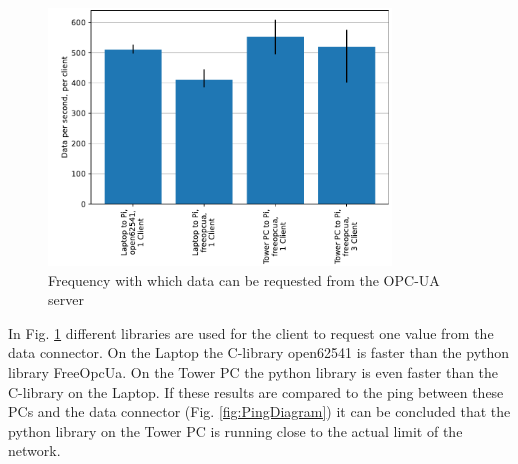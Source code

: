 \documentclass[conference]{IEEEtran}
\begin{document}
\begin{figure}[htbp]
    \centerline{\includegraphics[width=9.1cm]{Pictures/OPCUASpeed1D.pdf}}
    \caption{Frequency with which data can be requested from the OPC-UA server}
    \label{fig:OPCUASpeed1D}
\end{figure}
In Fig. \ref{fig:OPCUASpeed1D} different libraries are used for the client to request one value from the data connector.
On the Laptop the C-library open62541 is faster than the python library FreeOpcUa.
On the Tower PC the python library is even faster than the C-library on the Laptop.
If these results are compared to the ping between these PCs and the data connector (Fig. \ref{fig:PingDiagram}) it can be concluded that the python library on the Tower PC is running close to the actual limit of the network.\\
\end{document}
